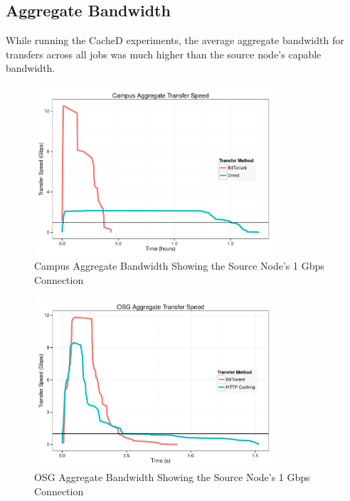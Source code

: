 \subsection{Aggregate Bandwidth}

While running the CacheD experiments, the average aggregate bandwidth for transfers across all jobs was much higher than the source node's capable bandwidth.

\begin{figure}
	\centering
	\includegraphics[width=0.8\textwidth]{data/CampusAggregate.pdf}
	\caption{Campus Aggregate Bandwidth Showing the Source Node's 1 Gbps Connection}
	\label{fig:campusaggregate}
\end{figure}

\begin{figure}
	\centering
	\includegraphics[width=0.8\textwidth]{data/OSGAggregate.pdf}
	\caption{OSG Aggregate Bandwidth Showing the Source Node's 1 Gbps Connection}
	\label{fig:osgaggregate}
\end{figure}

